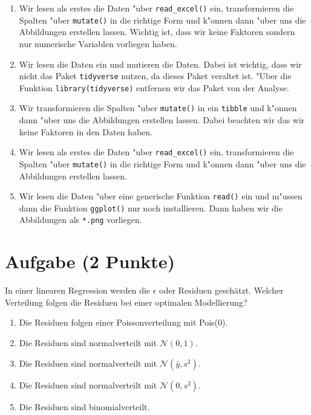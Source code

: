 \documentclass[a4paper, 10pt]{scrartcl}\usepackage[]{graphicx}\usepackage[]{xcolor}
\begin{document}
\begin{enumerate}
\item [\textbf{A} \msquare] Wir lesen als erstes die Daten {"u}ber \texttt{read\_excel()} ein, transformieren die Spalten {"u}ber \texttt{mutate()} in die richtige Form und k{"o}nnen dann  {"u}ber  uns die Abbildungen erstellen lassen. Wichtig ist, dass wir keine Faktoren sondern nur numerische Variablen vorliegen haben.
\item [\textbf{B} \msquare] Wir lesen die Daten ein und mutieren die Daten. Dabei ist wichtig, dass wir nicht das Paket \texttt{tidyverse} nutzen, da dieses Paket veraltet ist. {"U}ber die Funktion \texttt{library(tidyverse)} entfernen wir das Paket von der Analyse.
\item [\textbf{C} \msquare] Wir transformieren die Spalten {"u}ber \texttt{mutate()} in ein \texttt{tibble} und k{"o}nnen dann {"u}ber  uns die Abbildungen erstellen lassen. Dabei beachten wir das wir keine Faktoren in den Daten haben.
\item [\textbf{D} \msquare] Wir lesen als erstes die Daten {"u}ber \texttt{read\_excel()} ein, transformieren die Spalten {"u}ber \texttt{mutate()} in die richtige Form und k{"o}nnen dann {"u}ber  uns die Abbildungen erstellen lassen.
\item [\textbf{E} \msquare] Wir lesen die Daten {"u}ber eine generische Funktion \texttt{read()} ein und m{"u}ssen dann die Funktion \texttt{ggplot()} nur noch installieren. Dann haben wir die Abbildungen als \texttt{*.png} vorliegen.
\end{enumerate}

\section{Aufgabe \hfill (2 Punkte)}

In einer linearen Regression werden die $\epsilon$ oder Residuen
gesch{\"a}tzt. Welcher Verteilung folgen die Residuen bei einer optimalen
Modellierung? 



\begin{enumerate}
\item [\textbf{A} \msquare] Die Residuen folgen einer Poissonverteilung mit Pois(0).
\item [\textbf{B} \msquare] Die Residuen sind normalverteilt mit $\mathcal{N}(0, 1)$.
\item [\textbf{C} \msquare] Die Residuen sind normalverteilt mit $\mathcal{N}(\bar{y}, s^2)$.
\item [\textbf{D} \msquare] Die Residuen sind normalverteilt mit $\mathcal{N}(0, s^2)$.
\item [\textbf{E} \msquare] Die Residuen sind binomialverteilt.
\end{enumerate}
\end{document}
